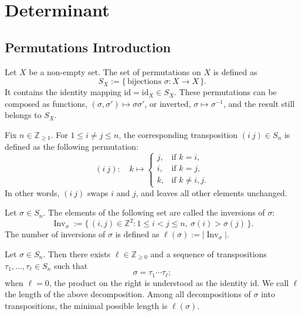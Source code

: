 \chapter{Determinant}

\section{Permutations Introduction}

\begin{definition}
Let $X$ be a non-empty set. The set of permutations on $X$ is defined as
\[
S_X := \{\, \text{bijections } \sigma : X \to X \,\} .
\]
It contains the identity mapping $\mathrm{id} = \mathrm{id}_X \in S_X$. These permutations can be composed as functions, $(\sigma, \sigma') \mapsto \sigma \sigma'$, or inverted, $\sigma \mapsto \sigma^{-1}$, and the result still belongs to $S_X$.
\end{definition}

\begin{definition}
Fix $n \in \mathbb{Z}_{\geq 1}$. For $1 \leq i \neq j \leq n$, the corresponding transposition $(i\ j) \in S_n$ is defined as the following permutation:
\[
(i\ j):\quad k \mapsto
\begin{cases}
j, & \text{if } k = i, \\
i, & \text{if } k = j, \\
k, & \text{if } k \neq i, j.
\end{cases}
\]
In other words, $(i\ j)$ swaps $i$ and $j$, and leaves all other elements unchanged.
\end{definition}

\begin{definition}
Let $\sigma \in S_n$. The elements of the following set are called the inversions of $\sigma$:
\[
\operatorname{Inv}_\sigma := \{\, (i, j) \in \mathbb{Z}^2 : 1 \leq i < j \leq n,\ \sigma(i) > \sigma(j) \,\}.
\]
The number of inversions of $\sigma$ is defined as $\ell(\sigma) := |\operatorname{Inv}_\sigma|$.
\end{definition}

\begin{proposition}
Let $\sigma \in S_n$. Then there exists $\ell \in \mathbb{Z}_{\geq 0}$ and a sequence of transpositions $\tau_1, \ldots, \tau_\ell \in S_n$ such that
\[
\sigma = \tau_1 \cdots \tau_\ell ;
\]
when $\ell = 0$, the product on the right is understood as the identity $\mathrm{id}$. We call $\ell$ the length of the above decomposition. Among all decompositions of $\sigma$ into transpositions, the minimal possible length is $\ell(\sigma)$.
\end{proposition}

